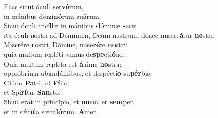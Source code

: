 \evenverse Ecce sicut ócu\textbf{li} ser\textbf{vó}rum,~\*\\
\evenverse in mánibus domi\textbf{nó}rum su\textbf{ó}rum.\\
\oddverse Sicut óculi ancíllæ in mánibus \textbf{dó}minæ \textbf{su}æ:~\*\\
\oddverse ita óculi nostri ad Dóminum, Deum nostrum, donec misere\textbf{á}tur \textbf{no}stri.\\
\evenverse Miserére nostri, Dómine, mise\textbf{ré}re \textbf{no}stri:~\*\\
\evenverse quia multum repléti sumus de\textbf{spe}cti\textbf{ó}ne:\\
\oddverse Quia multum repléta est \textbf{á}nima \textbf{no}stra:~\*\\
\oddverse oppróbrium abundántibus, et despécti\textbf{o} su\textbf{pér}bis.\\
\evenverse Glória \textbf{Pa}tri, et \textbf{Fí}lio,~\*\\
\evenverse et Spi\textbf{rí}tui \textbf{San}cto.\\
\oddverse Sicut erat in princípio, et \textbf{nunc}, et \textbf{sem}per,~\*\\
\oddverse et in sǽcula sæcu\textbf{ló}rum. \textbf{A}men.\\

